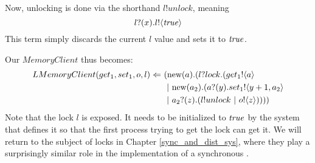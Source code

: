 Now, unlocking is done via the shorthand $l!unlock$, meaning
\[
	{l}?({x}). {l}!\langle{ \ensuremath{\text{\emph{true}}} }\rangle
\]
This term simply discards the current $l$ value and sets it to $\text{\emph{true}}$.  

Our $MemoryClient$ thus becomes:
\begin{equation}\begin{split}
	LMemoryClient(get_1,set_1,o,l)\Leftarrow\  & (\text{new}({a}).(l?lock.({get_1}!\langle{a}\rangle\\
	&\ |\  \text{new}({a_2}).({a}?({y}). {set_1}!\langle{y+1,a_2}\rangle\\
	&\ |\  {a_2}?({z}).(l!unlock\ |\  {o}!\langle{z}\rangle))))
\end{split}\end{equation}
Note that the lock $l$ is exposed.  
It needs to be initialized to $\text{\emph{true}}$ by the system that defines it so that the first process trying to get the lock can get it.   
We will return to the subject of locks in Chapter \ref{sync_and_dist_sys}, where they play a surprisingly similar role in the implementation of a synchronous \picalc.